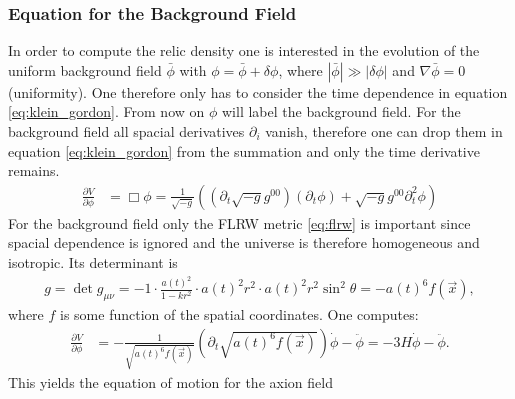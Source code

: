 \documentclass[a4paper, 12pt]{article}
\begin{document}
\subsubsection{Equation for the Background Field}
In order to compute the relic density one is interested in the evolution of the uniform background field $\bar{\phi}$ with $\phi = \bar{\phi} + \delta \phi$, where
$|\bar{\phi}| \gg |\delta \phi|$ and $\nabla \bar{\phi} = 0$ (uniformity). One therefore only has to consider the time dependence in equation \ref{eq:klein_gordon}. From now on $\phi$ will label the background field.
For the background field all spacial derivatives $\partial_i$ vanish, therefore one can drop them in equation \ref{eq:klein_gordon} from the summation and only the time derivative remains.
\begin{align*}
    \frac{\partial V}{\partial \phi} &= \Box \phi
                                     = \frac{1}{\sqrt{-g}} \left( (\partial_t \sqrt{-g} g^{00}) (\partial_t \phi) + \sqrt{-g} g^{00} \partial^2_t \phi \right)
\end{align*}
For the background field only the FLRW metric \ref{eq:flrw}
is important since spacial dependence is ignored and the universe is therefore homogeneous and isotropic. Its determinant is
\begin{align*}
    g = \det g_{\mu \nu} = -1 \cdot \frac{a(t)^2}{1 - kr^2} \cdot a(t)^2 r^2 \cdot a(t)^2 r^2 \sin^2 \theta = - a(t)^6 f(\vec{x}),
\end{align*}
where $f$ is some function of the spatial coordinates. One computes:
\begin{align*}
    \frac{\partial V}{\partial \phi} &= - \frac{1}{\sqrt{a(t)^6 f(\vec{x})}} (\partial_t \sqrt{ a(t)^6 f(\vec{x}) }) \dot{\phi} - \ddot{\phi}
                                     = - 3H \dot{\phi} - \ddot{\phi}.
\end{align*}
This yields the equation of motion for the axion field \cite[Chap 4.2, Page 25]{MarshAxionCosmo}
\end{document}
